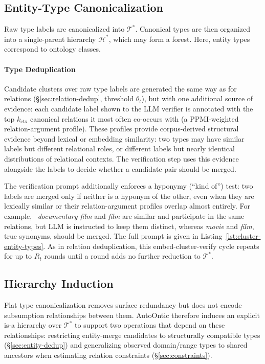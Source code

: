 \documentclass[11pt]{article}
\begin{document}
\subsection{Entity-Type Canonicalization}
\label{sec:type-dedup}

Raw type labels are canonicalized into $\mathcal{T}^*$.
Canonical types are then organized into a single-parent hierarchy
$\mathcal{H}^*$, which may form a forest.
Here, entity types correspond to ontology classes.

\paragraph{Type Deduplication}
Candidate clusters over raw type labels are generated the same way as for
relations (\S\ref{sec:relation-dedup}, threshold $\theta_t$), but with one additional source of evidence: each candidate label shown to the LLM verifier is annotated with the top $k_{\text{ctx}}$ canonical relations it most often co-occurs with (a PPMI-weighted relation-argument profile). These profiles provide corpus-derived structural evidence beyond lexical or embedding similarity: two types may have similar labels but different relational roles, or different labels but nearly identical distributions of relational contexts. The verification step uses this evidence alongside the labels to decide whether a candidate pair should be merged.

The verification prompt additionally enforces a hyponymy (``kind of'') test: two labels are merged only if neither is a hyponym of the other, even when they are lexically similar or their relation-argument profiles overlap almost entirely. For example, \ \emph{documentary film} and \emph{film} are similar and participate in the same relations, but LLM is instructed to keep them distinct, whereas \emph{movie} and \emph{film}, true synonyms, should
be merged. The full prompt is given in Listing~\ref{lst:cluster-entity-types}. As in relation deduplication, this embed-cluster-verify cycle repeats for up to $R_t$ rounds until a round adds no further reduction to $\mathcal{T}^*$.

\subsection{Hierarchy Induction}
\label{sec:hierarchy-induction}
Flat type canonicalization removes surface redundancy but does not encode subsumption relationships between them. AutoOntic therefore induces an explicit is-a hierarchy over $\mathcal{T}^*$ to support two operations that depend on these relationships: restricting entity-merge candidates to structurally compatible types
(\S\ref{sec:entity-dedup}) and generalizing observed domain/range types to shared ancestors when estimating relation constraints (\S\ref{sec:constraints}).
\end{document}
